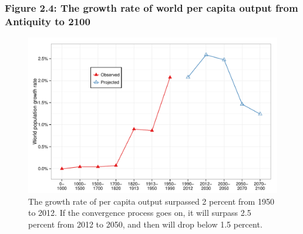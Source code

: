 \documentclass[t]{beamer}\usepackage[]{graphicx}\usepackage[]{color}
\newenvironment{knitrout}{}{} %
\begin{document}
\begin{frame}[label=Figure_2_4]
\frametitle{Figure 2.4: The growth rate of world per capita output from Antiquity to 2100}
\begin{figure}[t]
\begin{minipage}[b]{\textwidth}
\centering
\begin{knitrout}\footnotesize
{}\color{fgcolor}

{\centering \includegraphics[width=1\linewidth]{figures/color/Figure_2_4} 

}



\end{knitrout}
\caption{The growth rate of per capita output surpassed 2 percent from 1950 to 2012. If the convergence process goes on, it will surpass 2.5 percent from 2012 to 2050, and then will drop below 1.5 percent.}
\end{minipage}
\end{figure}
\end{frame}
\end{document}

